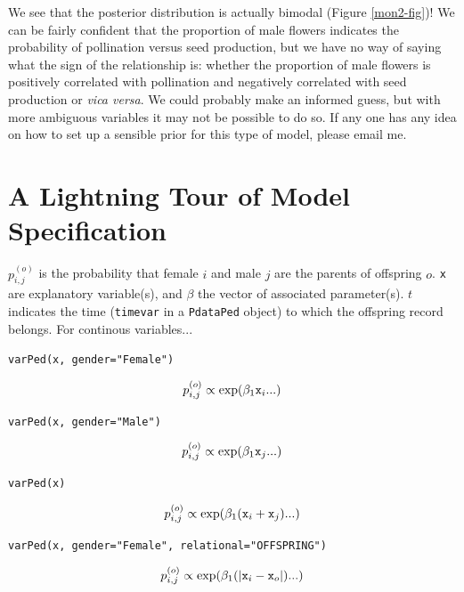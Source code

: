 \documentclass{article}
\begin{document}
We see that the posterior distribution is actually bimodal (Figure \ref{mon2-fig})! We can be fairly confident that the proportion of male flowers indicates the probability of pollination versus seed production, but we have no way of saying what the sign of the relationship is: whether the proportion of male flowers is positively correlated with pollination and negatively correlated with seed production or \emph{vica versa}.  We could probably make an informed guess, but with more ambiguous variables it may not be possible to do so.  If any one has any idea on how to set up a sensible prior for this type of model, please email me.  

\newpage
\appendix
\section{A Lightning Tour of Model Specification}
\label{models-app}

$p^{(o)}_{i,j}$ is the probability that female $i$ and male $j$ are the parents of offspring $o$. \texttt{x} are explanatory variable(s), and $\beta$ the vector of associated parameter(s). $t$ indicates the time (\texttt{timevar} in a \texttt{PdataPed} object) to which the offspring record belongs.  For continous variables...

\texttt{varPed(x, gender="Female")}

\begin{equation}
p^{(o)}_{i,j} \propto \textrm{exp}(\beta_{1}\textrm{\texttt{x}}_{i}...)
\end{equation}

\texttt{varPed(x, gender="Male")}

\begin{equation}
p^{(o)}_{i,j} \propto \textrm{exp}(\beta_{1}\textrm{\texttt{x}}_{j}...)
\end{equation}

\texttt{varPed(x)}

\begin{equation}
p^{(o)}_{i,j} \propto \textrm{exp}(\beta_{1}(\textrm{\texttt{x}}_{i}+\textrm{\texttt{x}}_{j})...)
\end{equation}

\texttt{varPed(x, gender="Female", relational="OFFSPRING")}

\begin{equation}
p^{(o)}_{i,j} \propto \textrm{exp}(\beta_{1}(|\textrm{\texttt{x}}_{i}-\textrm{\texttt{x}}_{o}|)...)
\end{equation}
\end{document}
